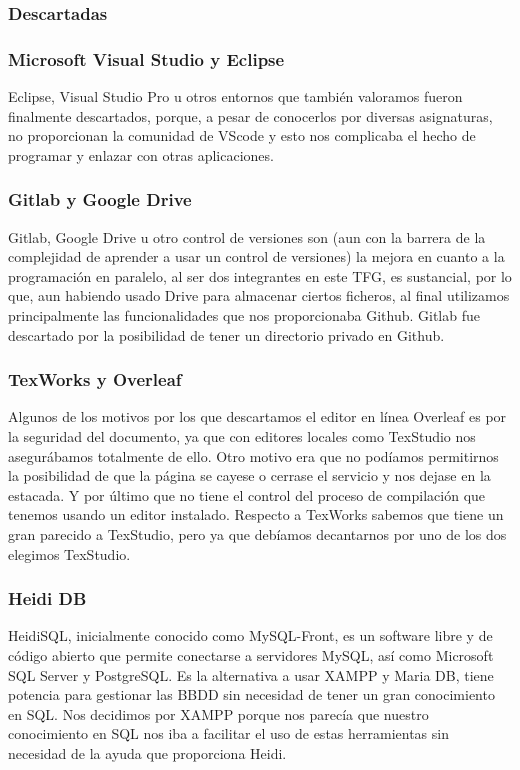 		
 	\subsubsection{Descartadas}
 		   \subsubsection*{Microsoft Visual Studio y Eclipse}
 		   Eclipse, Visual Studio Pro u otros entornos que también valoramos fueron finalmente descartados, porque, a pesar de conocerlos por diversas asignaturas, no proporcionan la comunidad de VScode y esto nos complicaba el hecho de programar y enlazar con otras aplicaciones.
 		   
 		   \subsubsection*{Gitlab y Google Drive}
 		   Gitlab, Google Drive u otro control de versiones son (aun con la barrera de la complejidad de aprender a usar un control de versiones) la mejora en cuanto a la programación en paralelo, al ser dos integrantes en este TFG, es sustancial, por lo que, aun habiendo usado Drive para almacenar ciertos ficheros, al final utilizamos principalmente las funcionalidades que nos proporcionaba Github. Gitlab fue descartado por la posibilidad de tener un directorio privado en Github.
 		   
 		   \subsubsection*{TexWorks y Overleaf}
 		   Algunos de los motivos por los que descartamos el editor en línea Overleaf es por la seguridad del documento, ya que con editores locales como TexStudio nos asegurábamos totalmente de ello. Otro motivo era que no podíamos permitirnos la posibilidad de que la página se cayese o cerrase el servicio y nos dejase en la estacada. Y por último que no tiene el control del proceso de compilación que tenemos usando un editor instalado.   
 		   Respecto a TexWorks sabemos que tiene un gran parecido a TexStudio, pero ya que debíamos decantarnos por uno de los dos elegimos TexStudio.
 		   
 		   \subsubsection*{Heidi DB}
 		   HeidiSQL, inicialmente conocido como MySQL-Front, es un software libre y de código abierto que permite conectarse a servidores MySQL, así como Microsoft SQL Server y PostgreSQL. Es la alternativa a usar XAMPP y Maria DB, tiene potencia para gestionar las BBDD sin necesidad de tener un gran conocimiento en SQL.    
 		   Nos decidimos por XAMPP porque nos parecía que nuestro conocimiento en SQL nos iba a facilitar el uso de estas herramientas sin necesidad de la ayuda que proporciona Heidi.
 		   
